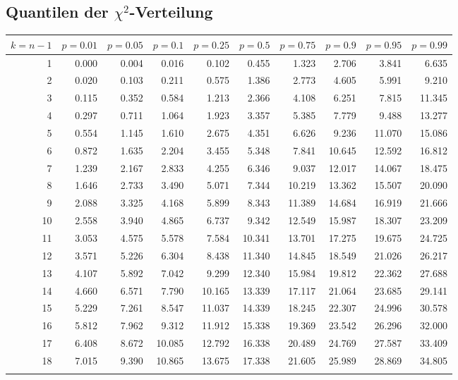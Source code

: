 	\subsection{Quantilen der $\chi^2$-Verteilung}
	\begin{minipage}{\textwidth}
\begin{center}
\begin{tabular}{|r|rrr|rrr|rrr|}
\hline
\strut$k = n-1$&$p=0.01$&$p=0.05$&$p=0.1$&$p=0.25$&$p=0.5$&$p=0.75$&$p=0.9$&$p=0.95$&$p=0.99$\\
\hline
\rowcolor[gray]{.9}
1&0.000&0.004&0.016&0.102&0.455&1.323&2.706&3.841&6.635\\
2&0.020&0.103&0.211&0.575&1.386&2.773&4.605&5.991&9.210\\
\rowcolor[gray]{.9}
3&0.115&0.352&0.584&1.213&2.366&4.108&6.251&7.815&11.345\\
4&0.297&0.711&1.064&1.923&3.357&5.385&7.779&9.488&13.277\\
\rowcolor[gray]{.9}
5&0.554&1.145&1.610&2.675&4.351&6.626&9.236&11.070&15.086\\
6&0.872&1.635&2.204&3.455&5.348&7.841&10.645&12.592&16.812\\
\rowcolor[gray]{.9}
7&1.239&2.167&2.833&4.255&6.346&9.037&12.017&14.067&18.475\\
8&1.646&2.733&3.490&5.071&7.344&10.219&13.362&15.507&20.090\\
\rowcolor[gray]{.9}
9&2.088&3.325&4.168&5.899&8.343&11.389&14.684&16.919&21.666\\
10&2.558&3.940&4.865&6.737&9.342&12.549&15.987&18.307&23.209\\
\rowcolor[gray]{.9}
11&3.053&4.575&5.578&7.584&10.341&13.701&17.275&19.675&24.725\\
12&3.571&5.226&6.304&8.438&11.340&14.845&18.549&21.026&26.217\\
\rowcolor[gray]{.9}
13&4.107&5.892&7.042&9.299&12.340&15.984&19.812&22.362&27.688\\
14&4.660&6.571&7.790&10.165&13.339&17.117&21.064&23.685&29.141\\
\rowcolor[gray]{.9}
15&5.229&7.261&8.547&11.037&14.339&18.245&22.307&24.996&30.578\\
16&5.812&7.962&9.312&11.912&15.338&19.369&23.542&26.296&32.000\\
\rowcolor[gray]{.9}
17&6.408&8.672&10.085&12.792&16.338&20.489&24.769&27.587&33.409\\
18&7.015&9.390&10.865&13.675&17.338&21.605&25.989&28.869&34.805\\
\rowcolor[gray]{.9}

\end{tabular}
\end{center}
\end{minipage}
